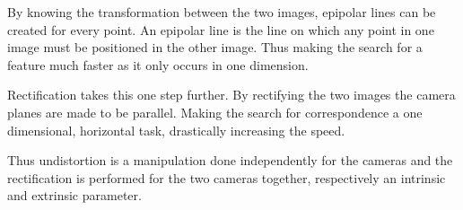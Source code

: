 By knowing the transformation between the two images, epipolar lines can be created for every point. An epipolar line is the line on which any point in one image must be positioned in the other image. Thus making the search for a feature much faster as it only occurs in one dimension.

Rectification takes this one step further. By rectifying the two images the camera planes are made to be parallel. Making the search for correspondence a one dimensional, horizontal task, drastically increasing the speed.

% 

Thus undistortion is a manipulation done independently for the cameras and the rectification is performed for the two cameras together, respectively an intrinsic and extrinsic parameter.


%
%
%
%
%
%
%
%
%
